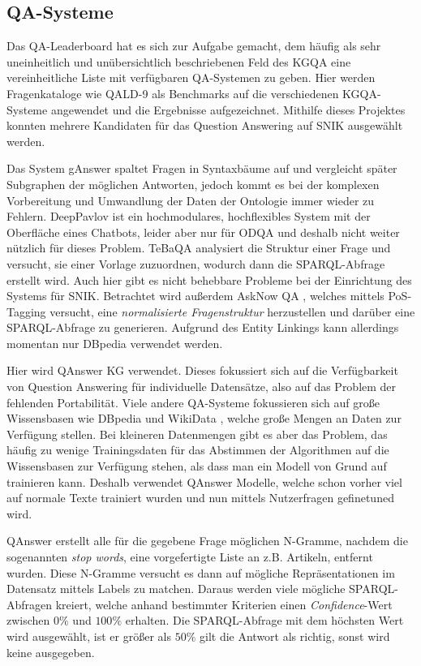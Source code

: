 \documentclass[utf8,biblatex]{lni}
\begin{document}
\subsection{QA-Systeme}

Das QA-Leaderboard \citep{leaderboardinproceedings} hat es sich zur Aufgabe gemacht,
dem häufig als sehr uneinheitlich und unübersichtlich \citep{diefenbachkbqa} beschriebenen Feld des KGQA eine vereinheitliche Liste mit verfügbaren QA-Systemen zu geben.
Hier werden Fragenkataloge wie QALD-9 \cite{qald9} als Benchmarks auf die verschiedenen KGQA-Systeme angewendet und die Ergebnisse aufgezeichnet.
Mithilfe dieses Projektes konnten mehrere Kandidaten für das Question Answering auf SNIK ausgewählt werden.

Das System gAnswer \cite{ganswerapproach} spaltet Fragen in Syntaxbäume auf und vergleicht später Subgraphen der möglichen Antworten, jedoch kommt es bei der komplexen Vorbereitung und Umwandlung der Daten der Ontologie immer wieder zu Fehlern.
DeepPavlov \cite{deeppavlov} ist ein hochmodulares, hochflexibles System mit der Oberfläche eines Chatbots, leider aber nur für ODQA und deshalb nicht weiter nützlich für dieses Problem.
TeBaQA \cite{tebaqa} analysiert die Struktur einer Frage und versucht, sie einer Vorlage zuzuordnen, wodurch dann die SPARQL-Abfrage erstellt wird.
Auch hier gibt es nicht behebbare Probleme bei der Einrichtung des Systems für SNIK.
Betrachtet wird außerdem AskNow QA \cite{asknow}, welches mittels PoS-Tagging versucht, eine \emph{normalisierte Fragenstruktur} herzustellen und darüber eine SPARQL-Abfrage zu generieren.
Aufgrund des Entity Linkings kann allerdings momentan nur DBpedia verwendet werden.

Hier wird QAnswer KG \cite{qanswer} verwendet.
Dieses fokussiert sich auf die Verfügbarkeit von Question Answering für individuelle Datensätze,
also auf das Problem der fehlenden Portabilität.
Viele andere QA-Systeme fokussieren sich auf große Wissensbasen wie DBpedia und WikiData \cite{qald9plus},
welche große Mengen an Daten zur Verfügung stellen.
Bei kleineren Datenmengen gibt es aber das Problem, das häufig zu wenige Trainingsdaten für das Abstimmen der Algorithmen auf die Wissensbasen zur Verfügung stehen, als dass man ein Modell von Grund auf trainieren kann.
Deshalb verwendet QAnswer Modelle, welche schon vorher viel auf normale Texte trainiert wurden und nun mittels Nutzerfragen gefinetuned wird.

QAnswer erstellt alle für die gegebene Frage möglichen N-Gramme, nachdem die sogenannten \emph{stop words}, eine vorgefertigte Liste an z.B. Artikeln, entfernt wurden.
Diese N-Gramme versucht es dann auf mögliche Repräsentationen im Datensatz mittels Labels zu matchen.
Daraus werden viele mögliche SPARQL-Abfragen kreiert, welche anhand bestimmter Kriterien einen \emph{Confidence}-Wert zwischen $0\%$ und $100\%$ erhalten.
Die SPARQL-Abfrage mit dem höchsten Wert wird ausgewählt, ist er größer als $50\%$ gilt die Antwort als richtig, sonst wird keine ausgegeben.
\end{document}
